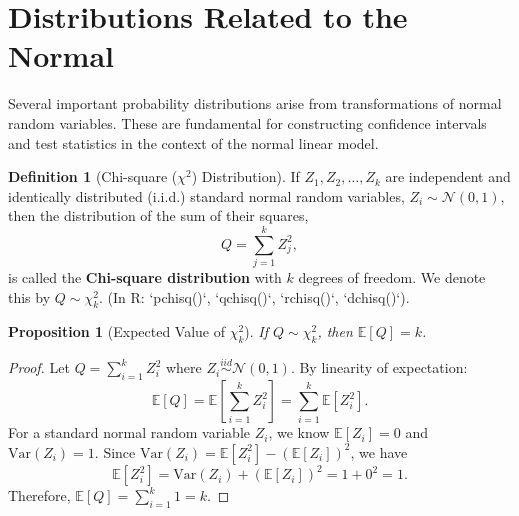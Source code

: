\documentclass[11pt, letterpaper]{article}
\theoremstyle{plain} %
\newtheorem{proposition}[theorem]{Proposition}
\theoremstyle{definition} %
\newtheorem{definition}[theorem]{Definition}
\theoremstyle{remark} %
\newcommand{\E}{\mathbb{E}}
\newcommand{\V}{\mathrm{Var}} %
\newcommand{\Normal}{\mathcal{N}}
\newcommand{\Chisq}{\chi^2}
\begin{document}
\section{Distributions Related to the Normal}

Several important probability distributions arise from transformations of normal random variables. These are fundamental for constructing confidence intervals and test statistics in the context of the normal linear model.

\begin{definition}[Chi-square ($\Chisq$) Distribution] \label{def:chisq}
If $Z_1, Z_2, \ldots, Z_k$ are independent and identically distributed (i.i.d.) standard normal random variables, $Z_i \sim \Normal(0, 1)$, then the distribution of the sum of their squares,
\[
Q = \sum_{j=1}^{k} Z_j^2,
\]
is called the \textbf{Chi-square distribution} with $k$ degrees of freedom. We denote this by $Q \sim \Chisq_k$.
(In R: `pchisq()`, `qchisq()`, `rchisq()`, `dchisq()`).
\end{definition}

\begin{proposition}[Expected Value of $\Chisq_k$]
If $Q \sim \Chisq_k$, then $\E[Q] = k$.
\end{proposition}
\begin{proof}
Let $Q = \sum_{i=1}^{k} Z_i^2$ where $Z_i \stackrel{iid}{\sim} \Normal(0, 1)$. By linearity of expectation:
\[
\E[Q] = \E\left[ \sum_{i=1}^{k} Z_i^2 \right] = \sum_{i=1}^{k} \E[Z_i^2].
\]
For a standard normal random variable $Z_i$, we know $\E[Z_i] = 0$ and $\V(Z_i) = 1$. Since $\V(Z_i) = \E[Z_i^2] - (\E[Z_i])^2$, we have
\[
\E[Z_i^2] = \V(Z_i) + (\E[Z_i])^2 = 1 + 0^2 = 1.
\]
Therefore, $\E[Q] = \sum_{i=1}^{k} 1 = k$.
\end{proof}
\end{document}
